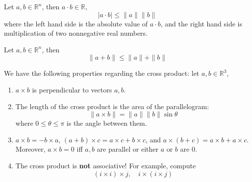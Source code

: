 \documentclass[openany]{book}
\newcommand{\R}{\mathbb{R}}
\begin{document}
\begin{prop}
    Let $a,b\in\R^n$, then $a\cdot b\in\R$, 
    \begin{equation*}
        |a\cdot b|\leq\|a\|\|b\|
    \end{equation*}
    where the left hand side is the absolute value of $a\cdot b$, and the right hand side is multiplication of two nonnegative real numbers.
\end{prop}


\begin{prop}\label{traingle}
    Let $a,b\in\R^n$, then 
    \begin{equation*}
        \|a+b\|\leq\|a\|+\|b\|
    \end{equation*}
\end{prop}



\begin{prop}
    We have the following properties regarding the cross product: let $a,b\in\R^3$,
    \begin{enumerate}
        \item $a\times b$ is perpendicular to vectors $a,b$.
        \item The length of the cross product is the area of the parallelogram:
        \begin{equation*}
            \|a\times b\|=\|a\|\|b\|\sin\theta
        \end{equation*}
        where $0\leq\theta\leq\pi$ is the angle between them. 
        \item $a\times b=-b\times a$, $(a+b)\times c=a\times c+b\times c$, and $a\times (b+c)=a\times b+a\times c$. Moreover, $a\times b=0$ iff $a,b$ are parallel or either $a$ or $b$ are $0$.
        \item The cross product is \textbf{not} associative! For example, compute 
        \begin{equation*}
            (i\times i)\times j, \quad i\times (i\times j)
        \end{equation*}
    \end{enumerate}
\end{prop}
\end{document}
